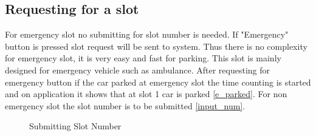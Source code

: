 \subsection{Requesting for a slot}
For emergency slot no submitting for slot number is needed. If "Emergency" button is pressed slot request will be sent to system. Thus there is no complexity for emergency slot, it is very easy and fast for parking. This slot is mainly designed for emergency vehicle such as ambulance. After requesting for emergency button if the car parked at emergency slot the time counting is started and on application it shows that at slot 1 car is parked \ref{e_parked}. For non emergency slot the slot number is to be submitted \ref{input_num}. 

\begin{figure}[H]
\centering
{}
\hspace{1cm}
\caption{Submitting Slot Number }
\end{figure}

